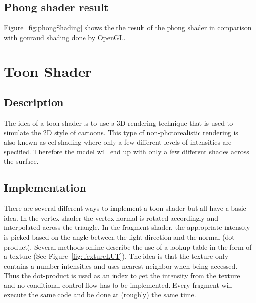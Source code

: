 \documentclass[a4paper,12pt]{article}
\begin{document}


\subsection{Phong shader result}
\label{sec:PhongShaderResult}
Figure~\ref{fig:phongShading} shows the the result of the phong shader in comparison with gouraud shading done by OpenGL.


\section{Toon Shader}
\label{sec:ToonShader}
\subsection{Description}
\label{sec:DescriptionToonShader}

The idea of a toon shader is to use a 3D rendering technique that is used to simulate the 2D style of cartoons. This type of non-photorealistic rendering is also known as cel-shading where only a few different levels of intensities are specified. Therefore the model will end up with only a few different shades across the surface.

\subsection{Implementation}
\label{sec:ImplementationToonShader}

There are several different ways to implement a toon shader but all have a basic idea. In the vertex shader the vertex normal is rotated accordingly and interpolated across the triangle. In the fragment shader, the appropriate intensity is picked based on the angle between the light direction and the normal (dot-product). Several methods online describe the use of a lookup table in the form of a texture (See Figure~\ref{fig:TextureLUT}). The idea is that the texture only contains a number intensities and uses nearest neighbor when being accessed. Thus the dot-product is used as an index to get the intensity from the texture and no conditional control flow has to be implemented. Every fragment will execute the same code and be done at (roughly) the same time.
\end{document}
